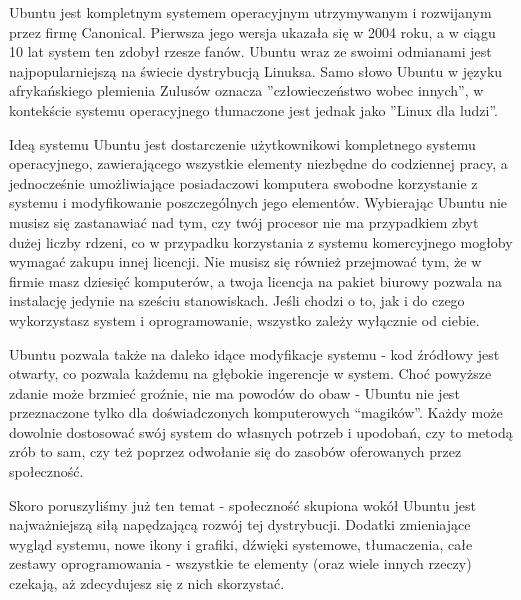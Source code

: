 Ubuntu jest kompletnym systemem operacyjnym utrzymywanym i rozwijanym przez firmę Canonical. Pierwsza jego wersja ukazała się w 2004 roku, a w ciągu 10 lat system ten zdobył rzesze fanów. Ubuntu wraz ze swoimi odmianami jest najpopularniejszą na świecie dystrybucją Linuksa. Samo słowo Ubuntu w języku afrykańskiego plemienia Zulusów oznacza ”człowieczeństwo wobec innych”, w kontekście systemu operacyjnego tłumaczone jest jednak jako ”Linux dla ludzi”.

Ideą systemu Ubuntu jest dostarczenie użytkownikowi kompletnego systemu operacyjnego, zawierającego wszystkie elementy niezbędne do codziennej pracy, a jednocześnie umożliwiające posiadaczowi komputera swobodne korzystanie z systemu i modyfikowanie poszczególnych jego elementów. Wybierając Ubuntu nie musisz się zastanawiać nad tym, czy twój procesor nie ma przypadkiem zbyt dużej liczby rdzeni, co w przypadku korzystania z systemu komercyjnego mogłoby wymagać zakupu innej licencji. Nie musisz się również przejmować tym, że w firmie masz dziesięć komputerów, a twoja licencja na pakiet biurowy pozwala na instalację jedynie na sześciu stanowiskach. Jeśli chodzi o to, jak i do czego wykorzystasz system i oprogramowanie, wszystko zależy wyłącznie od ciebie.

Ubuntu pozwala także na daleko idące modyfikacje systemu - kod źródłowy jest otwarty, co pozwala każdemu na głębokie ingerencje w system. Choć powyższe zdanie może brzmieć groźnie, nie ma powodów do obaw - Ubuntu nie jest przeznaczone tylko dla doświadczonych komputerowych “magików”. Każdy może dowolnie dostosować swój system do własnych potrzeb i upodobań, czy to metodą zrób to sam, czy też poprzez odwołanie się do zasobów oferowanych przez społeczność.

Skoro poruszyliśmy już ten temat - społeczność skupiona wokół Ubuntu jest najważniejszą siłą napędzającą rozwój tej dystrybucji. Dodatki zmieniające wygląd systemu, nowe ikony i grafiki, dźwięki systemowe, tłumaczenia, całe zestawy oprogramowania - wszystkie te elementy (oraz wiele innych rzeczy) czekają, aż zdecydujesz się z nich skorzystać.
\clearpage
